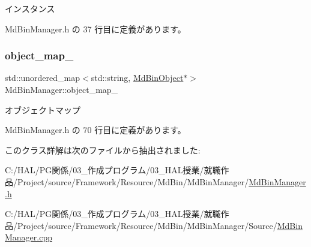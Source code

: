 インスタンス 



 Md\+Bin\+Manager.\+h の 37 行目に定義があります。

\mbox{\label{class_md_bin_manager_a595804fccdd750e02df524bb75cec65b}} 
\subsubsection{\texorpdfstring{object\+\_\+map\+\_\+}{object\_map\_}}
{\footnotesize\ttfamily std\+::unordered\+\_\+map$<$std\+::string, \mbox{\hyperlink{class_md_bin_object}{Md\+Bin\+Object}}$\ast$$>$ Md\+Bin\+Manager\+::object\+\_\+map\+\_\+\hspace{0.3cm}{\ttfamily [private]}}



オブジェクトマップ 



 Md\+Bin\+Manager.\+h の 70 行目に定義があります。



このクラス詳解は次のファイルから抽出されました\+:\begin{DoxyCompactItemize}
\item 
C\+:/\+H\+A\+L/\+P\+G関係/03\+\_\+作成プログラム/03\+\_\+\+H\+A\+L授業/就職作品/\+Project/source/\+Framework/\+Resource/\+Md\+Bin/\+Md\+Bin\+Manager/\mbox{\hyperlink{_md_bin_manager_8h}{Md\+Bin\+Manager.\+h}}\item 
C\+:/\+H\+A\+L/\+P\+G関係/03\+\_\+作成プログラム/03\+\_\+\+H\+A\+L授業/就職作品/\+Project/source/\+Framework/\+Resource/\+Md\+Bin/\+Md\+Bin\+Manager/\+Source/\mbox{\hyperlink{_md_bin_manager_8cpp}{Md\+Bin\+Manager.\+cpp}}\end{DoxyCompactItemize}
